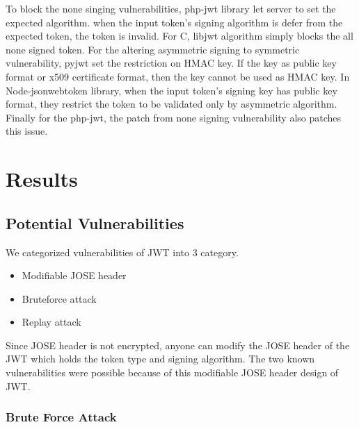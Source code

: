 \documentclass[journal,article,submit,moreauthors,pdftex,10pt,a4paper]{mdpi}
\begin{document}
To block the none singing vulnerabilities, php-jwt library let server to set the expected algorithm. when the input token's signing algorithm is defer from the expected token, the token is invalid. For C, libjwt algorithm simply blocks the all none signed token. For the altering asymmetric signing to symmetric vulnerability, pyjwt set the restriction on HMAC key. If the key as public key format or x509 certificate format, then the key cannot be used as HMAC key. In Node-jsonwebtoken library, when the input token's signing key has public key format, they restrict the token to be validated only by asymmetric algorithm. Finally for the php-jwt, the patch from none signing vulnerability also patches this issue.


\section{Results}
\subsection{Potential Vulnerabilities}
We categorized vulnerabilities of JWT into 3 category.
\begin{itemize}[leftmargin=*,labelsep=4mm]
\item Modifiable JOSE header
\item Bruteforce attack
\item Replay attack
\end{itemize}

Since JOSE header is not encrypted, anyone can modify the JOSE header of the JWT which holds the token type and signing algorithm. The two known vulnerabilities were possible because of this modifiable JOSE header design of JWT.


\subsubsection{Brute Force Attack}
\end{document}
